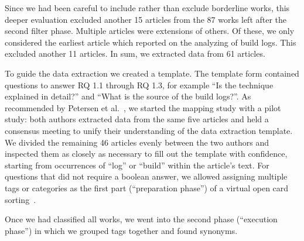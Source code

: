 Since we had been careful to include rather than exclude borderline
works, this deeper evaluation excluded another 15 articles from the 87
works left after the second filter phase.
Multiple articles were extensions of others.
Of these, we only considered the earliest article which reported on
the analyzing of build logs.
This excluded another 11 articles.
In sum, we extracted data from 61 articles.

To guide the data extraction we created a template.
The template form contained questions to answer RQ 1.1 through RQ 1.3,
for example ``Is the technique explained in detail?'' and
``What is the source of the build logs?''.
As recommended by Petersen et
al.~\cite{petersen2015guidelines}, we started the mapping study with a
pilot study:
both authors extracted data from the same five articles and held a
consensus meeting to unify their understanding
of the data extraction template.
We divided the remaining 46 articles evenly between the two authors
and inspected them as closely as necessary to fill out the template
with confidence,
starting from occurrences of ``log'' or ``build'' within the article's
text.
For questions that did not require a boolean answer, we allowed assigning
multiple tags or categories as the first part (``preparation phase'')
of a virtual open card sorting~\cite{zimmermann2016card}.

Once we had classified all works, we went into the second phase
(``execution phase'') in which we grouped tags
together and found synonyms.



